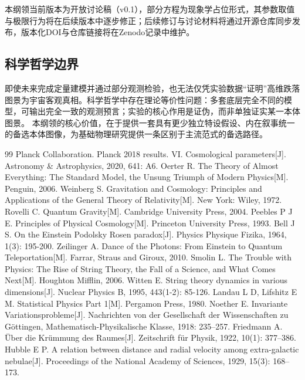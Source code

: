 \documentclass[12pt,a4paper]{ctexart}
\begin{document}
本纲领当前版本为开放讨论稿（v0.1），部分方程为现象学占位形式，其参数取值与极限行为将在后续版本中逐步修正；后续修订与讨论材料将通过开源仓库同步发布，版本化DOI与仓库链接将在Zenodo记录中维护。

\subsection{科学哲学边界}
即使未来完成定量建模并通过部分观测检验，也无法仅凭实验数据“证明”高维跌落图景为宇宙客观真相。科学哲学中存在理论等价性问题：多套底层完全不同的模型，可输出完全一致的观测预言；实验的核心作用是证伪，而非单独证实某一本体图景。
本纲领的核心价值，在于提供一套具有更少独立特设假设、内在叙事统一的备选本体图像，为基础物理研究提供一条区别于主流范式的备选路径\cite{popper1959, kuhn1962}。

\begin{thebibliography}{99}
 Planck Collaboration. Planck 2018 results. VI. Cosmological parameters[J]. Astronomy \& Astrophysics, 2020, 641: A6.
 Oerter R. The Theory of Almost Everything: The Standard Model, the Unsung Triumph of Modern Physics[M]. Penguin, 2006.
 Weinberg S. Gravitation and Cosmology: Principles and Applications of the General Theory of Relativity[M]. New York: Wiley, 1972.
 Rovelli C. Quantum Gravity[M]. Cambridge University Press, 2004.
 Peebles P J E. Principles of Physical Cosmology[M]. Princeton University Press, 1993.
 Bell J S. On the Einstein Podolsky Rosen paradox[J]. Physics Physique Fizika, 1964, 1(3): 195-200.
 Zeilinger A. Dance of the Photons: From Einstein to Quantum Teleportation[M]. Farrar, Straus and Giroux, 2010.
 Smolin L. The Trouble with Physics: The Rise of String Theory, the Fall of a Science, and What Comes Next[M]. Houghton Mifflin, 2006.
 Witten E. String theory dynamics in various dimensions[J]. Nuclear Physics B, 1995, 443(1-2): 85-126.
 Landau L D, Lifshitz E M. Statistical Physics Part 1[M]. Pergamon Press, 1980.
 Noether E. Invariante Variationsprobleme[J]. Nachrichten von der Gesellschaft der Wissenschaften zu Göttingen, Mathematisch-Physikalische Klasse, 1918: 235–257.
 Friedmann A. Über die Krümmung des Raumes[J]. Zeitschrift für Physik, 1922, 10(1): 377–386.
 Hubble E P. A relation between distance and radial velocity among extra-galactic nebulae[J]. Proceedings of the National Academy of Sciences, 1929, 15(3): 168–173.

\end{thebibliography}
\end{document}
